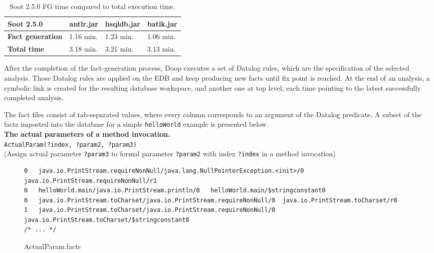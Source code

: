 \documentclass{dithesis}
\begin{document}
        \begin{table}[H]
            \centering
                \begin{tabular}{llll}
                \hline
                \textbf{Soot 2.5.0}      & \textbf{antlr.jar} & \textbf{hsqldb.jar} & \textbf{batik.jar} \\ \hline
                \textbf{Fact generation} & 1.16 min.          & 1.23 min.           & 1.06 min.          \\
                \textbf{Total time}      & 3.18 min.          & 3.21 min.           & 3.13 min.          \\ \hline
                \end{tabular}
                \newline
            \caption[Soot 2.5.0 FG times]{Soot 2.5.0 FG time compared to total execution time.}
        \end{table}

    	After the completion of the fact-generation process, Doop executes a set of Datalog rules, which are the specification of the selected analysis. Those Datalog rules are applied on the EDB and keep producing new facts until fix point is reached. At the end of an analysis, a symbolic link is created for the resulting database workspace, and another one at top level, each time pointing to the latest successfully completed analysis.

        The fact files consist of tab-separated values, where every column corresponds to an argument of the Datalog predicate. 
        A subset of the facts imported into the database for a simple \texttt{helloWorld} example is presented below. \\
        
        \textbf{The actual parameters of a method invocation.}\\
        \texttt{ActualParam(?index, ?param2, ?param3)}\\
        (Assign actual parameter \texttt{?param3} to formal parameter \texttt{?param2} with index \texttt{?index} in a method invocation)
    	\begin{figure}[H]
\begin{lstlisting}
0   java.io.PrintStream.requireNonNull/java.lang.NullPointerException.<init>/0  java.io.PrintStream.requireNonNull/r1
0   helloWorld.main/java.io.PrintStream.println/0   helloWorld.main/$stringconstant0
0   java.io.PrintStream.toCharset/java.io.PrintStream.requireNonNull/0  java.io.PrintStream.toCharset/r0
1   java.io.PrintStream.toCharset/java.io.PrintStream.requireNonNull/0  java.io.PrintStream.toCharset/$stringconstant0
/* ... */
\end{lstlisting}
\caption{ActualParam.facts}
        \end{figure}
\end{document}
